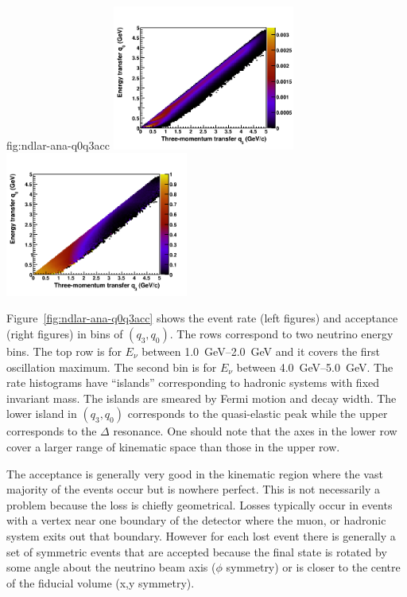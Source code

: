 \begin{dunefigure}{fig:ndlar-ana-q0q3acc}
      \includegraphics[width=0.45\textwidth]{graphics/lartpc/rate_q0q3_Ev_4000_5000.png}
      \includegraphics[width=0.45\textwidth]{graphics/lartpc/eff_q0q3_Ev_4000_5000.png}
\end{dunefigure}

Figure~\ref{fig:ndlar-ana-q0q3acc} shows the event rate (left figures) and acceptance (right figures) in bins of $(q_3,q_0)$.
The rows correspond to two neutrino energy bins.	
The top row is for $E_\nu$ between \SIrange{1.0}{2.0}{\giga\electronvolt} and it covers the first oscillation maximum. 
The second bin is for $E_\nu$ between \SIrange{4.0}{5.0}{\giga\electronvolt}.  
The rate histograms have ``islands''  corresponding to hadronic systems with fixed invariant mass. 
The islands are smeared by Fermi motion and decay width. 
The lower island in $(q_3,q_0)$ corresponds to the quasi-elastic peak while the upper corresponds to the $\Delta$ resonance. 
One should note that the axes in the lower row cover a larger range of kinematic space than those in the upper row. 

The acceptance is generally very good in the kinematic region where the vast majority of the events occur but is nowhere perfect. 
This is not necessarily a problem because the loss is chiefly geometrical. 
Losses typically occur in events with a vertex near one boundary of the detector where the muon, or hadronic system exits out that boundary.  
However for each lost event there is generally a set of symmetric events that are accepted because the final state is rotated by some angle about the neutrino beam axis ($\phi$ symmetry) or is closer to the centre of the fiducial volume (x,y symmetry).

